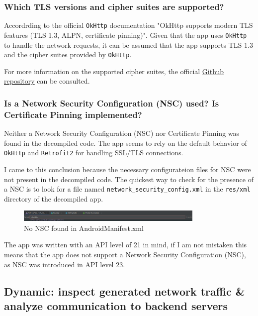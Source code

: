 \documentclass[12pt,a4paper]{article}
\begin{document}
\subsubsection{Which TLS versions and cipher suites are supported?}

Accordrding to the official \texttt{OkHttp} documentation "OkHttp supports modern TLS features (TLS 1.3, ALPN, certificate pinning)".
Given that the app uses \texttt{OkHttp} to handle the network requests, it can be assumed that the app supports TLS 1.3 and the cipher suites provided by \texttt{OkHttp}.

For more information on the supported cipher suites, the official \href{https://github.com/square/okhttp}{Github repository} can be consulted.

\subsubsection{Is a Network Security Configuration (NSC) used? Is Certificate Pinning implemented?}

Neither a Network Security Configuration (NSC) nor Certificate Pinning was found in the decompiled code. The app seems to rely on the default behavior of \texttt{OkHttp} and \texttt{Retrofit2} for handling SSL/TLS connections.

I came to this conclusion because the necessary configurateion files for NSC were not present in the decompiled code. The quickest way to check for the presence of a NSC is to look for a file named \texttt{network\_security\_config.xml} in the \texttt{res/xml} directory of the decompiled app.

\begin{figure}[H]
\centering
\includegraphics[width=0.8\textwidth]{./screenshots/no_nsc.png}
\caption{No NSC found in AndroidManifest.xml}
\end{figure}

The app was written with an API level of 21 in mind, if I am not mistaken this means that the app does not support a Network Security Configuration (NSC), as NSC was introduced in API level 23.

\subsection{Dynamic: inspect generated network traffic \& analyze communication to backend servers}
\end{document}
